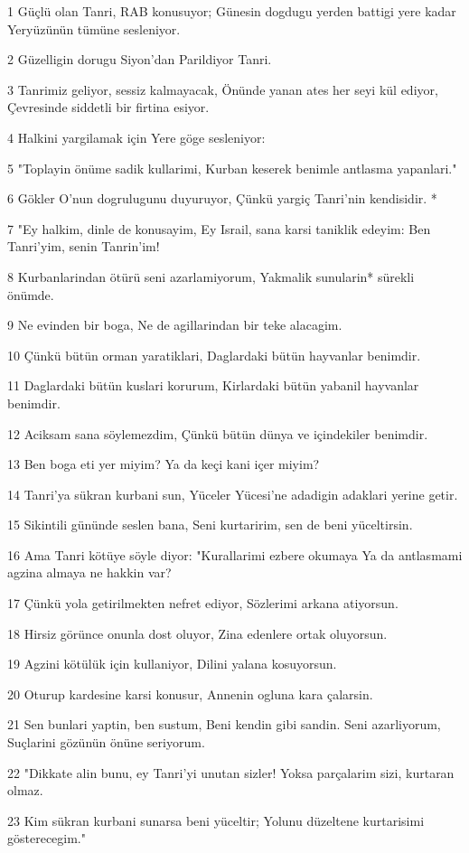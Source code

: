 \par 1 Güçlü olan Tanri, RAB konusuyor; Günesin dogdugu yerden battigi yere kadar Yeryüzünün tümüne sesleniyor.
\par 2 Güzelligin dorugu Siyon'dan Parildiyor Tanri.
\par 3 Tanrimiz geliyor, sessiz kalmayacak, Önünde yanan ates her seyi kül ediyor, Çevresinde siddetli bir firtina esiyor.
\par 4 Halkini yargilamak için Yere göge sesleniyor:
\par 5 "Toplayin önüme sadik kullarimi, Kurban keserek benimle antlasma yapanlari."
\par 6 Gökler O'nun dogrulugunu duyuruyor, Çünkü yargiç Tanri'nin kendisidir. *
\par 7 "Ey halkim, dinle de konusayim, Ey Israil, sana karsi taniklik edeyim: Ben Tanri'yim, senin Tanrin'im!
\par 8 Kurbanlarindan ötürü seni azarlamiyorum, Yakmalik sunularin* sürekli önümde.
\par 9 Ne evinden bir boga, Ne de agillarindan bir teke alacagim.
\par 10 Çünkü bütün orman yaratiklari, Daglardaki bütün hayvanlar benimdir.
\par 11 Daglardaki bütün kuslari korurum, Kirlardaki bütün yabanil hayvanlar benimdir.
\par 12 Aciksam sana söylemezdim, Çünkü bütün dünya ve içindekiler benimdir.
\par 13 Ben boga eti yer miyim? Ya da keçi kani içer miyim?
\par 14 Tanri'ya sükran kurbani sun, Yüceler Yücesi'ne adadigin adaklari yerine getir.
\par 15 Sikintili gününde seslen bana, Seni kurtaririm, sen de beni yüceltirsin.
\par 16 Ama Tanri kötüye söyle diyor: "Kurallarimi ezbere okumaya Ya da antlasmami agzina almaya ne hakkin var?
\par 17 Çünkü yola getirilmekten nefret ediyor, Sözlerimi arkana atiyorsun.
\par 18 Hirsiz görünce onunla dost oluyor, Zina edenlere ortak oluyorsun.
\par 19 Agzini kötülük için kullaniyor, Dilini yalana kosuyorsun.
\par 20 Oturup kardesine karsi konusur, Annenin ogluna kara çalarsin.
\par 21 Sen bunlari yaptin, ben sustum, Beni kendin gibi sandin. Seni azarliyorum, Suçlarini gözünün önüne seriyorum.
\par 22 "Dikkate alin bunu, ey Tanri'yi unutan sizler! Yoksa parçalarim sizi, kurtaran olmaz.
\par 23 Kim sükran kurbani sunarsa beni yüceltir; Yolunu düzeltene kurtarisimi gösterecegim."

